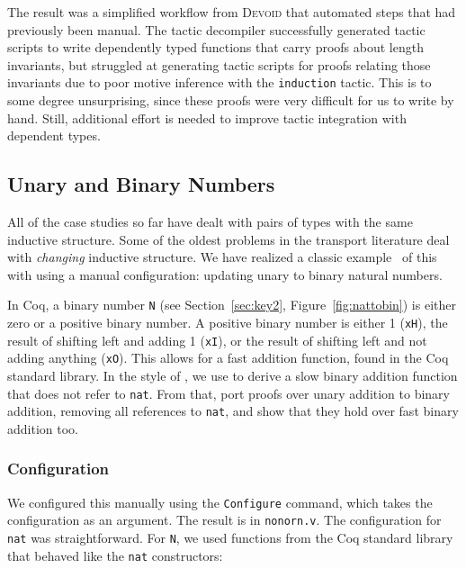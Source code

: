 The result was a simplified workflow from \textsc{Devoid} that automated steps 
that had previously been manual.
The tactic decompiler successfully generated tactic scripts to write dependently typed
functions that carry proofs about length invariants,
but struggled at generating tactic scripts for proofs relating those invariants due to poor motive inference with the \lstinline{induction} tactic.
This is to some degree unsurprising, since these proofs
were very difficult for us to write by hand.
Still, additional effort is needed to improve tactic integration with dependent types.

\subsection{Unary and Binary Numbers}
\label{sec:bin}

All of the case studies so far have dealt with pairs of types with the same inductive structure.
Some of the oldest problems in the transport literature deal with \textit{changing} inductive
structure.
We have realized a classic example~\cite{magaud2000changing}  of this with \toolname using a manual configuration:
updating unary to binary natural numbers.

In Coq, a binary number \lstinline{N} (see Section~\ref{sec:key2}, Figure~\ref{fig:nattobin}) is either zero or a positive binary number. A positive binary number
is either 1 (\lstinline{xH}), the result of shifting left and adding 1 (\lstinline{xI}),
or the result of shifting left and not adding anything (\lstinline{xO}).
This allows for a fast addition function, found in the Coq standard library.
In the style of \citet{magaud2000changing}, we use \toolname to derive a slow binary
addition function that does not refer to \lstinline{nat}.
From that, port proofs over unary addition to binary addition,
removing all references to \lstinline{nat}, and show that they hold over fast binary addition too.

\subsubsection{Configuration}
We configured this manually using the \lstinline{Configure} command,
which takes the configuration as an argument.
The result is in \lstinline{nonorn.v}.
The configuration for \lstinline{nat} was straightforward.
For \lstinline{N}, we used functions from the Coq standard library that
behaved like the \lstinline{nat} constructors:

